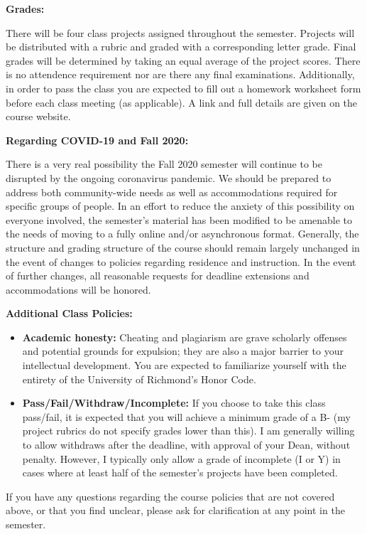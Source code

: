 \documentclass[12pt, a4paper]{article}
\begin{document}
\textbf{Grades:} \vspace{6pt}

There will be four class projects assigned throughout the semester. Projects will be
distributed with a rubric and graded with a corresponding letter grade. Final grades will
be determined by taking an equal average of the project scores. There is no attendence
requirement nor are there any final examinations. Additionally, in order to pass the class
you are expected to fill out a homework worksheet form before each class meeting
(as applicable). A link and full details are given on the course website.

\bigskip

\textbf{Regarding COVID-19 and Fall 2020:} \vspace{6pt}

There is a very real possibility the Fall 2020 semester will continue to be disrupted by
the ongoing coronavirus pandemic. We should be prepared to address both community-wide
needs as well as accommodations required for specific groups of people. In an effort to
reduce the anxiety of this possibility on everyone involved, the semester's material has
been modified to be amenable to the needs of moving to a fully online and/or asynchronous
format. Generally, the structure and grading structure of the course should remain largely
unchanged in the event of changes to policies regarding residence and instruction. In the
event of further changes, all reasonable requests for deadline extensions and
accommodations will be honored.

\bigskip

\textbf{Additional Class Policies:} \vspace{6pt}

\begin{itemize}\setlength\itemsep{0em}
\item \textbf{Academic honesty:}
Cheating and plagiarism are grave scholarly offenses and potential grounds
for expulsion; they are also a major barrier to your intellectual development.
You are expected to familiarize yourself with the entirety of the
University of Richmond’s Honor Code.
\item \textbf{Pass/Fail/Withdraw/Incomplete:} If you choose to take this
class pass/fail, it is expected that you will achieve a minimum grade of a B- (my project
rubrics do not specify grades lower than this). I am generally willing to allow withdraws
after the deadline, with approval of your Dean, without penalty. However, I typically only
allow a grade of incomplete (I or Y) in cases where at least half of the semester's projects
have been completed.
\end{itemize}

If you have any questions regarding the course policies that are not covered above, or
that you find unclear, please ask for clarification at any point in the semester.
\end{document}
